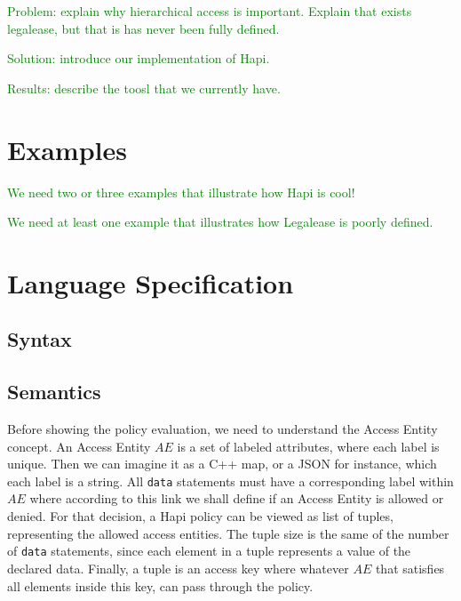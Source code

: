 \documentclass[sigplan,screen,anonymous,review]{acmart}\settopmatter{printfolios=true,printccs=false,printacmref=false}
\newcommand{\fer}[1]{\textcolor{green}{#1}}
\begin{document}




\fer{Problem: explain why hierarchical access is important. Explain that exists legalease, but that is has never been fully defined.}

\fer{Solution: introduce our implementation of Hapi.}

\fer{Results: describe the toosl that we currently have.}

\section{Examples}
\label{sec:examples}

\fer{We need two or three examples that illustrate how Hapi is cool!}

\fer{We need at least one example that illustrates how Legalease is poorly defined.}

\section{Language Specification}
\label{sec:spec}

\subsection{Syntax}
\label{sub:syntax}

\subsection{Semantics}
\label{sub:semantics}
Before showing the policy evaluation, we need to understand the Access Entity
concept.
An Access Entity $AE$ is a set of labeled attributes, where each label is
unique.
Then we can imagine it as a C++ map, or a JSON for instance, which each label
is a string.
All \texttt{data} statements must have a corresponding label within $AE$ where
according to this link we shall define if an Access Entity is allowed or
denied.
For that decision, a Hapi policy can be viewed as list of tuples, representing
the allowed access entities.
The tuple size is the same of the number of \texttt{data} statements, since
each element in a tuple represents a value of the declared data.
Finally, a tuple is an access key where whatever $AE$ that satisfies all
elements inside this key, can pass through the policy.
\end{document}

